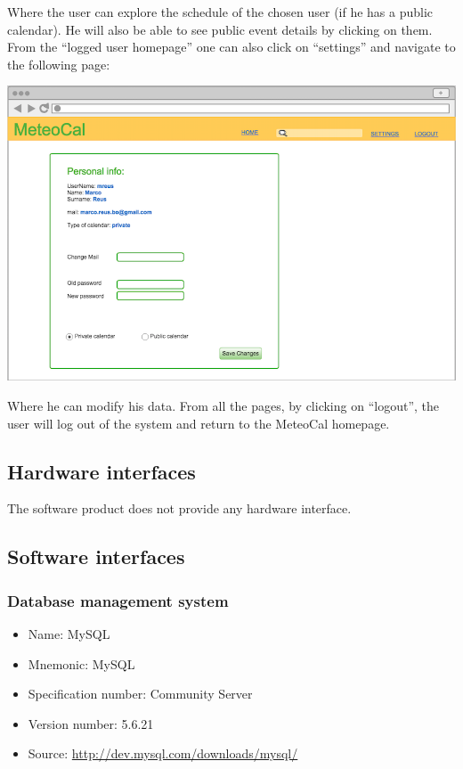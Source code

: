 \documentclass[10pt,a4paper,titlepage]{article}
\begin{document}
Where the user can explore the schedule of the chosen user (if he has a public calendar). He will also be able to see public event details by clicking on them.
From the “logged user homepage” one can also click on “settings” and navigate to the following page:

\vspace{3mm}\includegraphics[width={\linewidth}]{./UI_mockups/10-settings.png}\vspace{3mm}

Where he can modify his data.
From all the pages, by clicking on “logout”, the user will log out of the system and return to the MeteoCal homepage.

\subsection{Hardware interfaces}
The software product does not provide any hardware interface.

\subsection{Software interfaces}

\subsubsection{Database management system}
\begin{itemize}
\item Name: MySQL
\item Mnemonic: MySQL
\item Specification number: Community Server
\item Version number: 5.6.21
\item Source: \url{http://dev.mysql.com/downloads/mysql/}
\end{itemize}
\end{document}
